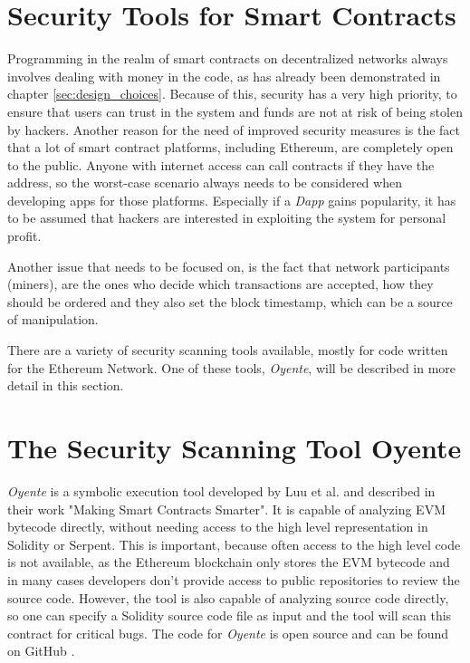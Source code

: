 \section{Security Tools for Smart Contracts}
Programming in the realm of smart contracts on decentralized networks always involves dealing with money in the code, as has already been demonstrated in chapter \ref{sec:design_choices}. Because of this, security has a very high priority, to ensure that users can trust in the system and funds are not at risk of being stolen by hackers. Another reason for the need of improved security measures is the fact that a lot of smart contract platforms, including Ethereum, are completely open to the public. Anyone with internet access can call contracts if they have the address, so the worst-case scenario always needs to be considered when developing apps for those platforms. Especially if a \emph{Dapp} gains popularity, it has to be assumed that hackers are interested in exploiting the system for personal profit.

Another issue that needs to be focused on, is the fact that network participants (miners), are the ones who decide which transactions are accepted, how they should be ordered and they also set the block timestamp, which can be a source of manipulation.

There are a variety of security scanning tools available, mostly for code written for the Ethereum Network. One of these tools, \emph{Oyente}, will be described in more detail in this section.

\section*{The Security Scanning Tool Oyente}

\emph{Oyente} is a symbolic execution tool developed by Luu et al. and described in their work "Making Smart Contracts Smarter"\cite{luu2016making}. It is capable of analyzing EVM bytecode directly, without needing access to the high level representation in Solidity or Serpent. This is important, because often access to the high level code is not available, as the Ethereum blockchain only stores the EVM bytecode and in many cases developers don't provide access to public repositories to review the source code. However, the tool is also capable of analyzing source code directly, so one can specify a Solidity source code file as input and the tool will scan this contract for critical bugs. The code for \emph{Oyente} is open source and can be found on GitHub \cite{oyentegithub}.

